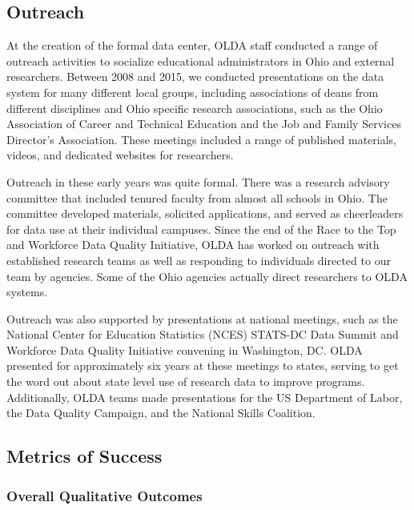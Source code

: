 \hypertarget{outreach-1}{%
\subsection{Outreach}\label{outreach-1}}

At the creation of the formal data center, OLDA staff conducted a range of outreach activities to socialize educational administrators in Ohio and external researchers. Between 2008 and 2015, we conducted presentations on the data system for many different local groups, including associations of deans from different disciplines and Ohio specific research associations, such as the Ohio Association of Career and Technical Education and the Job and Family Services Director's Association. These meetings included a range of published materials, videos, and dedicated websites for researchers.

Outreach in these early years was quite formal. There was a research advisory committee that included tenured faculty from almost all schools in Ohio. The committee developed materials, solicited applications, and served as cheerleaders for data use at their individual campuses. Since the end of the Race to the Top and Workforce Data Quality Initiative, OLDA has worked on outreach with established research teams as well as responding to individuals directed to our team by agencies. Some of the Ohio agencies actually direct researchers to OLDA systems.

Outreach was also supported by presentations at national meetings, such as the National Center for Education Statistics (NCES) STATS-DC Data Summit and Workforce Data Quality Initiative convening in Washington, DC. OLDA presented for approximately six years at these meetings to states, serving to get the word out about state level use of research data to improve programs. Additionally, OLDA teams made presentations for the US Department of Labor, the Data Quality Campaign, and the National Skills Coalition.

\hypertarget{metrics-of-success-1}{%
\subsection{Metrics of Success}\label{metrics-of-success-1}}

\hypertarget{overall-qualitative-outcomes}{%
\subsubsection*{Overall Qualitative Outcomes}\label{overall-qualitative-outcomes}}

